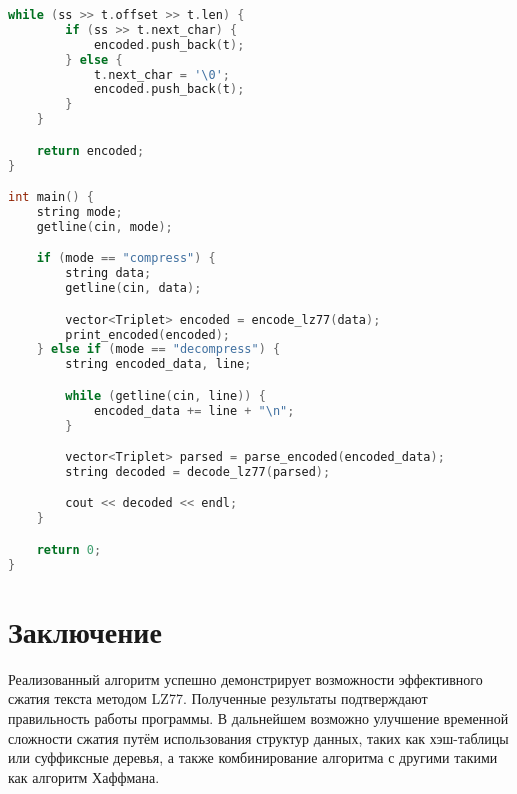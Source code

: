 \begin{lstlisting}[language=C++]
    while (ss >> t.offset >> t.len) {
        if (ss >> t.next_char) {
            encoded.push_back(t);
        } else {
            t.next_char = '\0';
            encoded.push_back(t);
        }
    }

    return encoded;
}

int main() {
    string mode;
    getline(cin, mode);

    if (mode == "compress") {
        string data;
        getline(cin, data);

        vector<Triplet> encoded = encode_lz77(data);
        print_encoded(encoded);
    } else if (mode == "decompress") {
        string encoded_data, line;

        while (getline(cin, line)) {
            encoded_data += line + "\n";
        }

        vector<Triplet> parsed = parse_encoded(encoded_data);
        string decoded = decode_lz77(parsed);

        cout << decoded << endl;
    }

    return 0;
}
\end{lstlisting}

\section*{Заключение}
Реализованный алгоритм успешно демонстрирует возможности эффективного сжатия текста методом LZ77. Полученные результаты подтверждают правильность работы программы. В дальнейшем возможно улучшение временной сложности сжатия путём использования структур данных, таких как хэш-таблицы или суффиксные деревья, а также комбинирование алгоритма с другими такими как алгоритм Хаффмана.